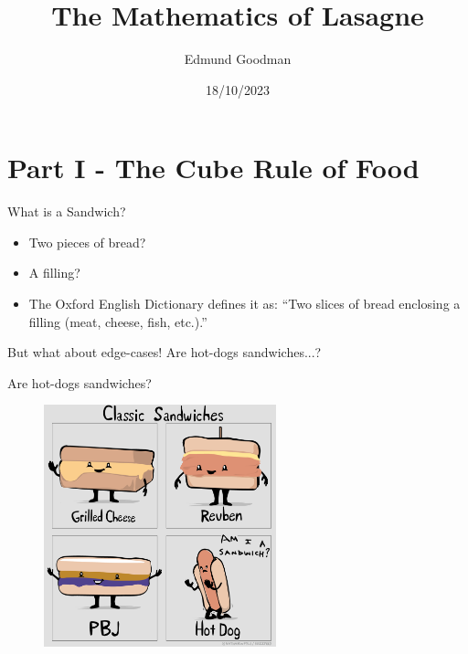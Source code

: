 \documentclass{beamer}
\title[The Mathematics of Lasagne]{The Mathematics of Lasagne}
\author{Edmund Goodman}
\institute[UWCS]{University of Warwick Computing Society}
\date{18/10/2023}
\begin{document}
\begin{frame}
  \titlepage
\end{frame}



\section{Part I - The Cube Rule of Food}

\begin{frame}{What is a Sandwich?}
    \begin{itemize}
        \item Two pieces of bread?
        \item A filling?
        \vskip 1cm
        \item The Oxford English Dictionary defines it as: ``Two slices of bread enclosing a filling (meat, cheese, fish, etc.).''
    \end{itemize}
    \vskip 1cm
    \begin{alertblock}{But what about edge-cases!}
        Are hot-dogs sandwiches...?
    \end{alertblock}
\end{frame}

\begin{frame}{Are hot-dogs sandwiches?}
    \begin{figure}
        \includegraphics[width=0.6\textwidth]{hotdog_meme.png}
        \label{fig:hotdog-meme}
    \end{figure}
\end{frame}
\end{document}
